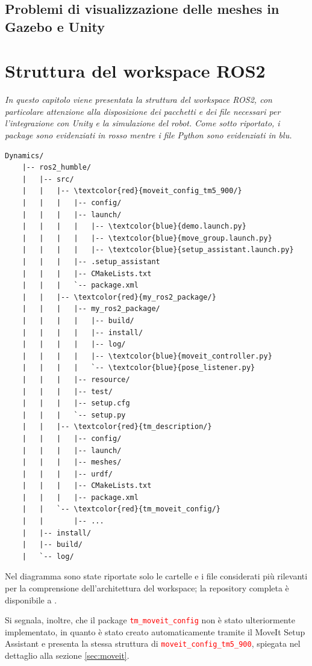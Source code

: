 \documentclass[11pt]{report}
\begin{document}
\section{Problemi di visualizzazione delle meshes in Gazebo e Unity}
\label{sec:visualizzazione_meshes}
\chapter{Struttura del workspace ROS2}
\textit{In questo capitolo viene presentata la struttura del workspace ROS2, con particolare attenzione alla disposizione dei pacchetti e dei file necessari per l'integrazione con Unity e la simulazione del robot. Come sotto riportato, i package sono evidenziati in rosso mentre i file Python sono evidenziati in blu.}

\begin{Verbatim}[commandchars=\\\{\}]
Dynamics/
    |-- ros2_humble/
    |   |-- src/
    |   |   |-- \textcolor{red}{moveit_config_tm5_900/}
    |   |   |   |-- config/
    |   |   |   |-- launch/
    |   |   |   |   |-- \textcolor{blue}{demo.launch.py}
    |   |   |   |   |-- \textcolor{blue}{move_group.launch.py}
    |   |   |   |   |-- \textcolor{blue}{setup_assistant.launch.py}
    |   |   |   |-- .setup_assistant
    |   |   |   |-- CMakeLists.txt
    |   |   |   `-- package.xml
    |   |   |-- \textcolor{red}{my_ros2_package/}
    |   |   |   |-- my_ros2_package/
    |   |   |   |   |-- build/
    |   |   |   |   |-- install/ 
    |   |   |   |   |-- log/
    |   |   |   |   |-- \textcolor{blue}{moveit_controller.py}
    |   |   |   |   `-- \textcolor{blue}{pose_listener.py}  
    |   |   |   |-- resource/
    |   |   |   |-- test/
    |   |   |   |-- setup.cfg
    |   |   |   `-- setup.py
    |   |   |-- \textcolor{red}{tm_description/}
    |   |   |   |-- config/
    |   |   |   |-- launch/  
    |   |   |   |-- meshes/
    |   |   |   |-- urdf/
    |   |   |   |-- CMakeLists.txt
    |   |   |   |-- package.xml
    |   |   `-- \textcolor{red}{tm_moveit_config/}
    |   |       |-- ...
    |   |-- install/
    |   |-- build/
    |   `-- log/
\end{Verbatim}

\newpage

Nel diagramma sono state riportate solo le cartelle e i file considerati più rilevanti per la comprensione dell'architettura del workspace; la repository completa è disponibile a \cite{Repository_ROS2}.

Si segnala, inoltre, che il package \textcolor{red}{\texttt{tm\_moveit\_config}} non è stato ulteriormente implementato, in quanto è stato creato automaticamente tramite il MoveIt Setup Assistant e presenta la stessa struttura di \textcolor{red}{\texttt{moveit\_config\_tm5\_900}}, spiegata nel dettaglio alla sezione \ref{sec:moveit}.
\end{document}
